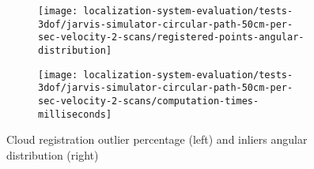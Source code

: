 \begin{figure}[hb]
	\centering
	\begin{subfigure}[h]{0.47\textwidth}
		\centering
		\texttt{[image: localization-system-evaluation/tests-3dof/jarvis-simulator-circular-path-50cm-per-sec-velocity-2-scans/registered-points-angular-distribution]}
	\end{subfigure}
	\begin{subfigure}[h]{0.47\textwidth}
		\centering
		\texttt{[image: localization-system-evaluation/tests-3dof/jarvis-simulator-circular-path-50cm-per-sec-velocity-2-scans/computation-times-milliseconds]}
	\end{subfigure}
	\caption{Cloud registration outlier percentage (left) and inliers angular distribution (right)}
	\label{fig:localization-system-evaluation_jarvis-simulator-circular-path-50cm-per-sec-velocity-2-scans_angular-distribution-analysis-computation-time}
\end{figure}
